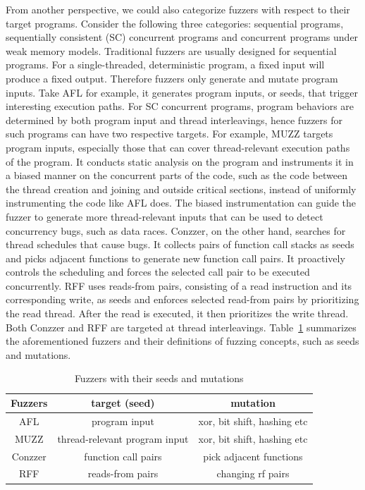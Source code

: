 From another perspective, we could also categorize fuzzers with respect to their target programs. Consider the following three categories: sequential programs, sequentially consistent (SC) concurrent programs and concurrent programs under weak memory models. Traditional fuzzers are usually designed for sequential programs. For a single-threaded, deterministic program, a fixed input will produce a fixed output. Therefore fuzzers only generate and mutate program inputs. Take AFL for example, it generates program inputs, or seeds, that trigger interesting execution paths. For SC concurrent programs, program behaviors are determined by both program input and thread interleavings, hence fuzzers for such programs can have two respective targets. For example, MUZZ\cite{muzz} targets program inputs, especially those that can cover thread-relevant execution paths of the program. It conducts static analysis on the program and instruments it in a biased manner on the concurrent parts of the code, such as the code between the thread creation and joining and outside critical sections, instead of uniformly instrumenting the code like AFL does. The biased instrumentation can guide the fuzzer to generate more thread-relevant inputs that can be used to detect concurrency bugs, such as data races. Conzzer\cite{conzzer}, on the other hand, searches for thread schedules that cause bugs. It collects pairs of function call stacks as seeds and picks adjacent functions to generate new function call pairs. It proactively controls the scheduling and forces the selected call pair to be executed concurrently. RFF\cite{rff} uses reads-from pairs, consisting of a read instruction and its corresponding write, as seeds and enforces selected read-from pairs by prioritizing the read thread. After the read is executed, it then prioritizes the write thread. Both Conzzer and RFF are targeted at thread interleavings. Table~\ref{fuzzer-concepts} summarizes the aforementioned fuzzers and their definitions of fuzzing concepts, such as seeds and mutations.


\begin{table}[h!]
	\centering
	\begin{tabular}{ |c|cc| }
		\hline
		Fuzzers & target (seed)                 & mutation                    \\
		\hline
		AFL     & program input                 & xor, bit shift, hashing etc \\
		MUZZ    & thread-relevant program input & xor, bit shift, hashing etc \\
		Conzzer & function call pairs           & pick adjacent functions     \\
		RFF     & reads-from pairs              & changing rf pairs           \\

		\hline
	\end{tabular}
	\caption{Fuzzers with their seeds and mutations}
	\label{fuzzer-concepts}
\end{table}

